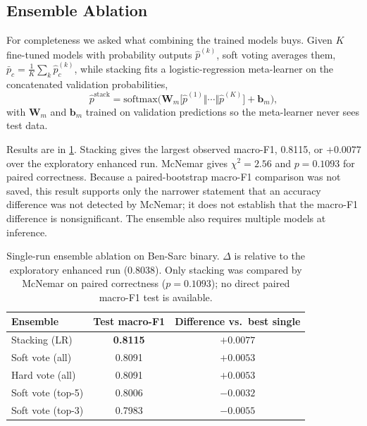 \documentclass{ieeeaccess}
\newcommand{\dset}[1]{#1}
\begin{document}
\subsection{Ensemble Ablation}
\label{sec:ensemble-results}

For completeness we asked what combining the trained models buys. Given $K$ fine-tuned models with probability outputs $\hat{p}^{(k)}$, soft voting averages them, $\bar{p}_c = \tfrac{1}{K}\sum_k \hat{p}^{(k)}_c$, while stacking fits a logistic-regression meta-learner on the concatenated validation probabilities,
\begin{equation}
\hat{p}^{\mathrm{stack}} = \mathrm{softmax}\!\big(\mathbf{W}_m\big[\hat{p}^{(1)}\Vert\cdots\Vert\hat{p}^{(K)}\big] + \mathbf{b}_m\big),
\label{eq:stacking}
\end{equation}
with $\mathbf{W}_m$ and $\mathbf{b}_m$ trained on validation predictions so the meta-learner never sees test data.

Results are in \cref{tab:ensemble}. Stacking gives the largest observed macro-F1, 0.8115, or $+0.0077$ over the exploratory enhanced run. McNemar gives $\chi^2=2.56$ and $p=0.1093$ for paired correctness. Because a paired-bootstrap macro-F1 comparison was not saved, this result supports only the narrower statement that an accuracy difference was not detected by McNemar; it does not establish that the macro-F1 difference is nonsignificant. The ensemble also requires multiple models at inference.

\begin{table}[!t]
\centering
\caption{Single-run ensemble ablation on \dset{Ben-Sarc} binary. $\Delta$ is relative to the exploratory enhanced run (0.8038). Only stacking was compared by McNemar on paired correctness ($p=0.1093$); no direct paired macro-F1 test is available.}
\label{tab:ensemble}
\footnotesize
\setlength{\tabcolsep}{2pt}
\begin{tabular}{@{}lcc@{}}
\toprule
\textbf{Ensemble} & \textbf{Test macro-F1} & \textbf{Difference vs.\ best single} \\
\midrule
Stacking (LR) & \textbf{0.8115} & $+0.0077$ \\
Soft vote (all) & 0.8091 & $+0.0053$ \\
Hard vote (all) & 0.8091 & $+0.0053$ \\
Soft vote (top-5) & 0.8006 & $-0.0032$ \\
Soft vote (top-3) & 0.7983 & $-0.0055$ \\
\bottomrule
\end{tabular}
\end{table}
\end{document}
